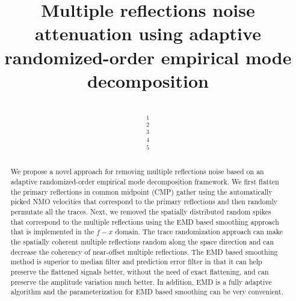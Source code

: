 \title{Multiple reflections noise attenuation using adaptive randomized-order empirical mode decomposition}
\renewcommand{\thefootnote}{\fnsymbol{footnote}}
\author{\\

$^1$ \\
$^2$\\ 
$^3$\\
$^4$ \\
$^5$ \\
}

\maketitle

\begin{abstract}
We propose a novel approach for removing multiple reflections noise based on an adaptive randomized-order empirical mode decomposition framework. We first flatten the primary reflections in common midpoint (CMP) gather using the automatically picked NMO velocities that correspond to the primary reflections and then randomly permutate all the traces. Next, we removed the spatially distributed random spikes that correspond to the multiple reflections using the EMD based smoothing approach that is implemented in the $f-x$ domain. The trace randomization approach can make the spatially coherent multiple reflections random along the space direction and can decrease the coherency of near-offset multiple reflections. The EMD based smoothing method is superior to median filter and prediction error filter in that it can help preserve the flattened signals better, without the need of exact flattening, and can preserve the amplitude variation much better. In addition, EMD is a fully adaptive algorithm and the parameterization for EMD based smoothing can be very convenient. 
\end{abstract}

